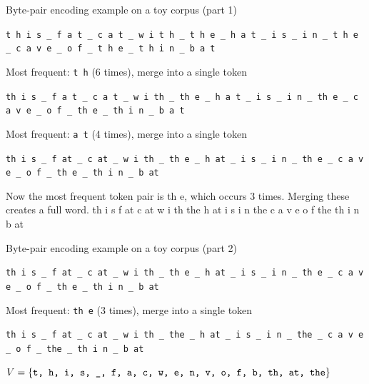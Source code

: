 \documentclass[12pt,aspectratio=169,handout]{beamer}
\begin{document}
\begin{frame}{Byte-pair encoding example on a toy corpus (part 1)}

\texttt{t h i s \_ f a t \_ c a t \_ w i t h \_ t h e \_ h a t \_ i s \_ i n \_ t h e \_ c a v e  \_ o f \_ t h e \_ t h i n \_ b a t}

Most frequent: \texttt{t h} (6 times), merge into a single token

\texttt{th i s \_ f a t \_ c a t \_ w i th \_ th e \_ h a t \_ i s \_ i n \_ th e \_ c a v e  \_ o f \_ th e \_ th i n \_ b a t}

Most frequent: \texttt{a t} (4 times), merge into a single token

\texttt{th i s \_ f at \_ c at \_ w i th \_ th e \_ h at \_ i s \_ i n \_ th e \_ c a v e  \_ o f \_ th e \_ th i n \_ b at}


Now the most frequent token pair is th e, which occurs 3 times.
Merging these creates a full word.
th i s f at c at w i th the h at i s i n the c a v e o f the
th i n b at


\end{frame}

\begin{frame}{Byte-pair encoding example on a toy corpus (part 2)}
	
\texttt{th i s \_ f at \_ c at \_ w i th \_ th e \_ h at \_ i s \_ i n \_ th e \_ c a v e  \_ o f \_ th e \_ th i n \_ b at}

Most frequent: \texttt{th e} (3 times), merge into a single token

\texttt{th i s \_ f at \_ c at \_ w i th \_ the \_ h at \_ i s \_ i n \_ the \_ c a v e  \_ o f \_ the \_ th i n \_ b at}

$V = \{
\text{\texttt{t, h, i, s, \_, f, a, c, w, e, n, v, o, f, b, th, at, the}}
\}$



\end{frame}
\end{document}
